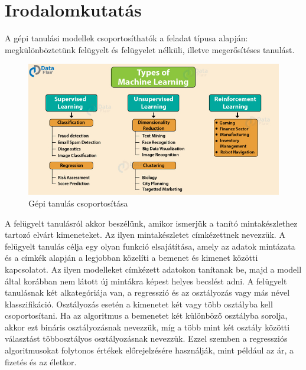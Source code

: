 \section{Irodalomkutatás}
\label{sec:irodalom}



A gépi tanulási modellek csoportosíthatók a feladat típusa alapján: megkülönböztetünk felügyelt és felügyelet nélküli, illetve megerősítéses tanulást.

\begin{figure}[h]
	\centering
	\includegraphics[width=1\columnwidth]{figures/machine_learning_types.png}
	\caption{Gépi tanulás csoportosítása}
\end{figure}

A felügyelt tanulásról akkor beszélünk, amikor ismerjük a tanító mintakészlethez tartozó elvárt kimeneteket. Az ilyen mintakészletet címkézettnek nevezzük. A felügyelt tanulás célja egy olyan funkció elsajátítása, amely az adatok mintázata és a címkék alapján a legjobban közelíti a bemenet és kimenet közötti kapcsolatot. Az ilyen modelleket címkézett adatokon tanítanak be, majd a modell által korábban nem látott új mintákra képest helyes becslést adni. A felügyelt tanulásnak két alkategóriája van, a regresszió és az osztályozás vagy más nével klasszifikáció. Osztályozás esetén a kimenetet két vagy több osztályba kell csoportosítani. Ha az algoritmus a bemenetet két különböző osztályba sorolja, akkor ezt bináris osztályozásnak nevezzük, míg a több mint két osztály közötti választást többosztályos osztályozásnak nevezzük. Ezzel szemben a regressziós algoritmusokat folytonos értékek előrejelzésére használják, mint például az ár, a fizetés és az életkor. 


